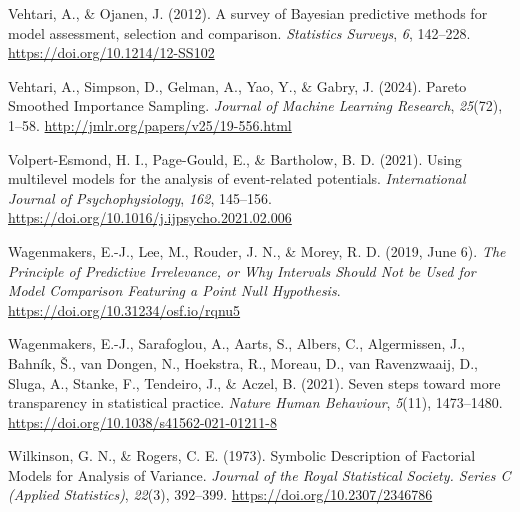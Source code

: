 \documentclass[
  doc,12pt,floatsintext]{apa7}
\newlength{\cslhangindent}
\newenvironment{CSLReferences}[2] %
 {\begin{list}{}{%
  \setlength{\itemindent}{0pt}
  \setlength{\leftmargin}{0pt}
  \setlength{\parsep}{0pt}
  \ifodd #1
   \setlength{\leftmargin}{\cslhangindent}
   \setlength{\itemindent}{-1\cslhangindent}
  \fi
  \setlength{\itemsep}{#2\baselineskip}}}
 {\end{list}}
\begin{document}
\begin{CSLReferences}{1}{0}
Vehtari, A., \& Ojanen, J. (2012). A survey of {Bayesian} predictive methods for model assessment, selection and comparison. \emph{Statistics Surveys}, \emph{6}, 142--228. \url{https://doi.org/10.1214/12-SS102}

Vehtari, A., Simpson, D., Gelman, A., Yao, Y., \& Gabry, J. (2024). Pareto {Smoothed Importance Sampling}. \emph{Journal of Machine Learning Research}, \emph{25}(72), 1--58. \url{http://jmlr.org/papers/v25/19-556.html}

Volpert-Esmond, H. I., Page-Gould, E., \& Bartholow, B. D. (2021). Using multilevel models for the analysis of event-related potentials. \emph{International Journal of Psychophysiology}, \emph{162}, 145--156. \url{https://doi.org/10.1016/j.ijpsycho.2021.02.006}

Wagenmakers, E.-J., Lee, M., Rouder, J. N., \& Morey, R. D. (2019, June 6). \emph{The {Principle} of {Predictive Irrelevance}, or {Why Intervals Should Not} be {Used} for {Model Comparison Featuring} a {Point Null Hypothesis}}. \url{https://doi.org/10.31234/osf.io/rqnu5}

Wagenmakers, E.-J., Sarafoglou, A., Aarts, S., Albers, C., Algermissen, J., Bahník, Š., van Dongen, N., Hoekstra, R., Moreau, D., van Ravenzwaaij, D., Sluga, A., Stanke, F., Tendeiro, J., \& Aczel, B. (2021). Seven steps toward more transparency in statistical practice. \emph{Nature Human Behaviour}, \emph{5}(11), 1473--1480. \url{https://doi.org/10.1038/s41562-021-01211-8}

Wilkinson, G. N., \& Rogers, C. E. (1973). Symbolic {Description} of {Factorial Models} for {Analysis} of {Variance}. \emph{Journal of the Royal Statistical Society. Series C (Applied Statistics)}, \emph{22}(3), 392--399. \url{https://doi.org/10.2307/2346786}

\end{CSLReferences}

\newpage



\end{document}

